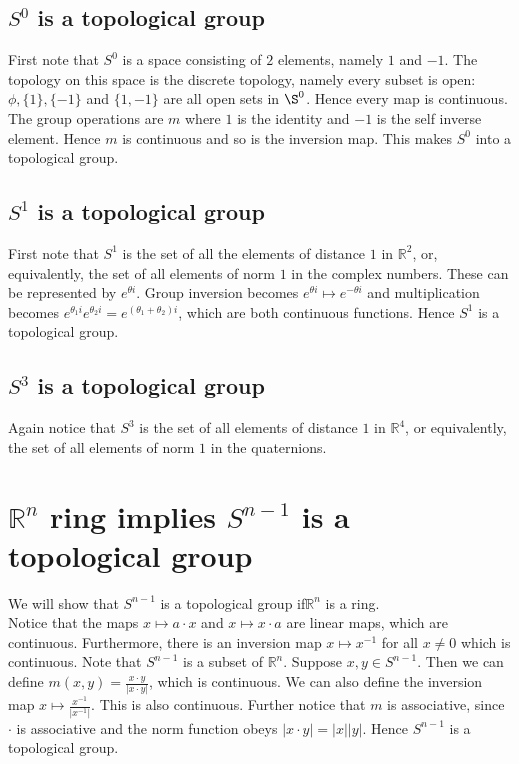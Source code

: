 \documentclass[../Thesis.tex]{subfiles}
\begin{document}
\subsection{$S^0$ is a topological group}
First note that $S^0$ is a space consisting of $2$ elements, namely $1$ and $-1$. The topology on this space is the discrete topology, namely every subset is open: $\phi, \{1\}, \{-1\}$ and $\{1, -1\}$ are all open sets in $\S^0$. Hence every map is continuous. The group operations are $m$ where $1$ is the identity and $-1$ is the self inverse element. Hence $m$ is continuous and so is the inversion map. This makes $S^0$ into a topological group.
\subsection{$S^1$ is a topological group}
First note that $S^1$ is the set of all the elements of distance $1$ in $\mathbb{R}^2$, or, equivalently, the set of all elements of norm $1$ in the complex numbers. These can be represented by $e^{\theta i}$. Group inversion becomes $e^{\theta i} \mapsto e^{-\theta i}$ and multiplication becomes $e^{\theta_1 i} e^{\theta_2 i} = e^{(\theta_1 + \theta_2)i}$, which are both continuous functions. Hence $S^1$ is a topological group.
\subsection{$S^3$ is a topological group}
Again notice that $S^3$ is the set of all elements of distance $1$ in $\mathbb{R}^4$, or equivalently, the set of all elements of norm $1$ in the quaternions.
\section{$\mathbb{R}^n$ ring implies $S^{n-1}$ is a topological group}
We will show that $S^{n-1}$ is a topological group if$\mathbb{R}^n$ is a ring. 
\\Notice that the maps $x \mapsto a\cdot x$ and $x \mapsto x \cdot a$ are linear maps, which are continuous. Furthermore, there is an inversion map $x \mapsto x^{-1}$ for all $x \neq 0$ which is continuous. Note that $S^{n-1}$ is a subset of $\mathbb{R}^n$. Suppose $x,y \in S^{n-1}$. Then we can define $m(x,y) = \frac{x\cdot y}{|x \cdot y|}$, which is continuous. We can also define the inversion map $x \mapsto \frac{x^{-1}}{|x^{-1}|}$. This is also continuous. Further notice that $m$ is associative, since $\cdot$ is associative and the norm function obeys $|x\cdot y| = |x||y|$. Hence $S^{n-1}$ is a topological group.
\end{document}
